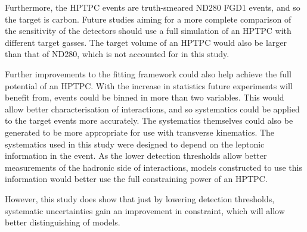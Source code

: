 Furthermore, the HPTPC events are truth-smeared ND280 FGD1 events, and so the target is carbon. Future studies aiming for a more complete comparison of the sensitivity of the detectors should use a full simulation of an HPTPC with different target gasses. The target volume of an HPTPC would also be larger than that of ND280, which is not accounted for in this study. 

Further improvements to the fitting framework could also help achieve the full potential of an HPTPC. With the increase in statistics future experiments will benefit from, events could be binned in more than two variables. This would allow better characterisation of interactions, and so systematics could be applied to the target events more accurately. The systematics themselves could also be generated to be more appropriate for use with transverse kinematics. The systematics used in this study were designed to depend on the leptonic information in the event. As the lower detection thresholds allow better measurements of the hadronic side of interactions, models constructed to use this information would better use the full constraining power of an HPTPC.

However, this study does show that just by lowering detection thresholds, systematic uncertainties gain an improvement in constraint, which will allow better distinguishing of models.

\newpage